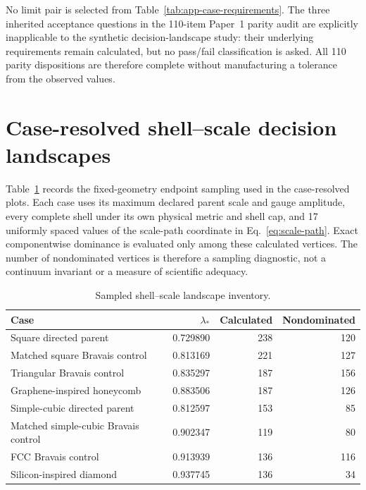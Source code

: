 No limit pair is selected from Table~\ref{tab:app-case-requirements}. The three inherited
acceptance questions in the 110-item Paper~1 parity audit are explicitly inapplicable to
the synthetic decision-landscape study: their underlying requirements remain calculated,
but no pass/fail classification is asked. All 110 parity dispositions are therefore
complete without manufacturing a tolerance from the observed values.

\section{Case-resolved shell--scale decision landscapes}
\label{app:case-decision-landscapes}

Table~\ref{tab:app-decision-landscape-inventory} records the fixed-geometry endpoint
sampling used in the case-resolved plots. Each case uses its maximum declared parent
scale and gauge amplitude, every complete shell under its own physical metric and shell
cap, and 17 uniformly spaced values of the scale-path coordinate in
Eq.~\eqref{eq:scale-path}. Exact componentwise dominance is evaluated only among these
calculated vertices. The number of nondominated vertices is therefore a sampling
diagnostic, not a continuum invariant or a measure of scientific adequacy.

\begin{table}[htbp]
\centering
\small
\caption{Sampled shell--scale landscape inventory.}
\label{tab:app-decision-landscape-inventory}
\begin{tabular}{@{}lrrr@{}}
\toprule
Case & $\lambda_*$ & Calculated & Nondominated \\
\midrule
Square directed parent & 0.729890 & 238 & 120 \\
Matched square Bravais control & 0.813169 & 221 & 127 \\
Triangular Bravais control & 0.835297 & 187 & 156 \\
Graphene-inspired honeycomb & 0.883506 & 187 & 126 \\
Simple-cubic directed parent & 0.812597 & 153 & 85 \\
Matched simple-cubic Bravais control & 0.902347 & 119 & 80 \\
FCC Bravais control & 0.913939 & 136 & 116 \\
Silicon-inspired diamond & 0.937745 & 136 & 34 \\
\bottomrule
\end{tabular}
\end{table}

